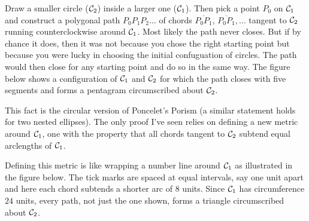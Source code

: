 \documentclass{ximera}
\begin{document}



Draw a smaller circle (${\cal C}_2$) inside a larger one (${\cal C}_1$). Then pick a point $P_0$ on ${\cal C}_1$ and construct a polygonal path $P_0 P_1 P_2 \ldots$ of chords $\overline{P_0P_1}$, $\overline{P_0P_1}, \ldots$ tangent to ${\cal C}_2$ running counterclockwise around ${\cal C}_1$. Most likely the path never closes.  But if by chance it does, then it was not because you chose the right starting point but because you were lucky in choosing the initial confuguation of circles. The path would then close for any starting point and do so in the same way. The figure below shows a configuration of ${\cal C}_1$ and ${\cal C}_2$ for which the path closes with five segments and forms a pentagram circumscribed about ${\cal C}_2$.


This fact is the circular version of Poncelet's Porism (a similar statement holds for two nested ellipses). The only proof I've seen relies on defining a new metric around ${\cal C}_1$, one with the property that all chords tangent to ${\cal C}_2$ subtend equal arclengths of ${\cal C}_1$. 

Defining this metric is like wrapping a number line around ${\cal C}_1$ as illustrated in the figure below. The tick marks are spaced at equal intervals, say one unit apart and here each chord subtends a shorter arc of $8$ units. Since ${\cal C}_1$ has circumference $24$ units, every path, not just the one shown, forms a triangle circumscribed about ${\cal C}_2$.  
\end{document}
